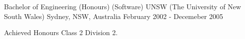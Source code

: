 

\begin{cventries}

  \cventry
    {Bachelor of Engineering (Honours) (Software)} %
    {UNSW (The University of New South Wales)} %
    {Sydney, NSW, Australia} %
    {February 2002 - Decemeber 2005} %
    {
      \begin{cvitems} %
        \item {Achieved Honours Class 2 Division 2.}
      \end{cvitems}
    }

\end{cventries}
